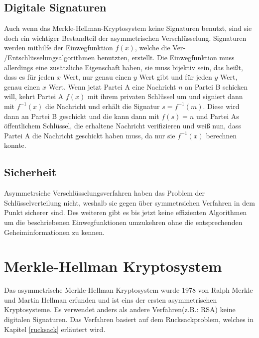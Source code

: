 \documentclass[a4paper,12pt,titlepage]{article}
\begin{document}
\subsection{Digitale Signaturen}
Auch wenn das Merkle-Hellman-Kryptosystem keine Signaturen benutzt, sind sie doch ein wichtiger Bestandteil der asymmetrischen Verschlüsselung.
Signaturen werden mithilfe der Einwegfunktion $f(x)$, welche die Ver- /Entschlüsselungsalgorithmen benutzten, erstellt. Die Einwegfunktion muss allerdings eine zusätzliche Eigenschaft haben, sie muss bijektiv sein, das heißt, dass es für jeden $x$ Wert, nur genau einen $y$ Wert gibt und für jeden $y$ Wert, genau einen $x$ Wert.
Wenn jetzt Partei A eine Nachricht $n$ an Partei B schicken will, kehrt Partei A $f(x)$ mit ihrem privaten Schlüssel um und signiert dann mit $f^{-1}(x)$ die Nachricht und erhält die Signatur $s = f^{-1}(m)$. Diese wird dann an Partei B geschickt und die kann dann mit $f(s) = n$ und Partei As öffentlichem Schlüssel, die erhaltene Nachricht verifizieren und weiß nun, dass Partei A die Nachricht geschickt haben muss, da nur sie $f^{-1}(x)$ berechnen konnte.
\subsection{Sicherheit} %
Asymmetrsiche Verschlüsselungsverfahren haben das Problem der Schlüsselverteilung nicht, weshalb sie gegen über symmetrsichen Verfahren in dem Punkt sicherer sind. Des weiteren gibt es bis jetzt keine effizienten Algorithmen um die beschriebenen Einwegfunktionen umzukehren ohne die entsprechenden Geheiminformationen zu kennen.



\section{Merkle-Hellman Kryptosystem}
Das asymmetrische Merkle-Hellman Kryptosystem wurde 1978 von Ralph Merkle und Martin Hellman erfunden und ist eins der ersten asymmetrischen Kryptosysteme. Es verwendet anders als andere Verfahren(z.B.: RSA) keine digitalen Signaturen. Das Verfahren basiert auf dem Rucksackproblem, welches in Kapitel \ref{rucksack} erläutert wird.

\end{document}
